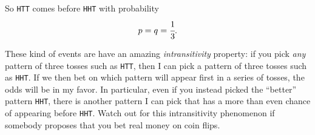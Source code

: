 \documentclass[12pt,twoside]{article}
\begin{document}
\begin{problem}{15}
{So \texttt{HTT} comes before \texttt{HHT} with probability
\[
p=q =\cfrac{1}{3}.
\]

These kind of events are have an amazing \emph{intransitivity}
property: if you pick \emph{any} pattern of three tosses such as
\texttt{HTT}, then I can pick a pattern of three tosses such as
\texttt{HHT}.  If we then bet on which pattern will appear first in a
series of tosses, the odds will be in my favor.  In particular, even
if you instead picked the ``better'' pattern \texttt{HHT}, there is
another pattern I can pick that has a more than even chance of
appearing before \texttt{HHT}.  Watch out for this intransitivity
phenomenon if somebody proposes that you bet real money on coin flips.
}

\eparts
\end{problem}

\end{document}

